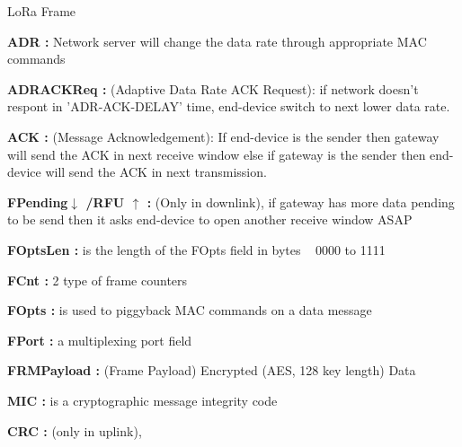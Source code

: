 \begin{frame}{LoRa Frame}{}
\begin{multicols}{2}
{	\item \textbf{ADR :}  Network server will change the data rate through appropriate MAC commands
	\item \textbf{ADRACKReq :} (Adaptive Data Rate ACK Request): if network doesn't respont in 'ADR-ACK-DELAY' time, end-device switch to next lower data rate.
	\item \textbf{ACK :} (Message Acknowledgement): If end-device is the sender then gateway will send the ACK in next receive window  else if gateway is the sender then end-device will send the ACK in next transmission.
	\item \textbf{FPending$\downarrow$ /RFU $\uparrow$ :} (Only in downlink), if gateway has more data pending to be send then it asks end-device to open another receive window ASAP
	\item \textbf{FOptsLen :} is the length of the FOpts field in bytes   0000 to 1111 
	\item \textbf{FCnt :}  2 type of frame counters 
	\item \textbf{FOpts :} is used to piggyback MAC commands on a data message	
	\item \textbf{FPort :}  a multiplexing port field
    \item \textbf{FRMPayload :} (Frame Payload)  Encrypted (AES, 128 key length) Data                                 
	\item \textbf{MIC :}  is a cryptographic message integrity code
	\item \textbf{CRC :} (only in uplink), 
}

\end{multicols}
 \end{frame}




